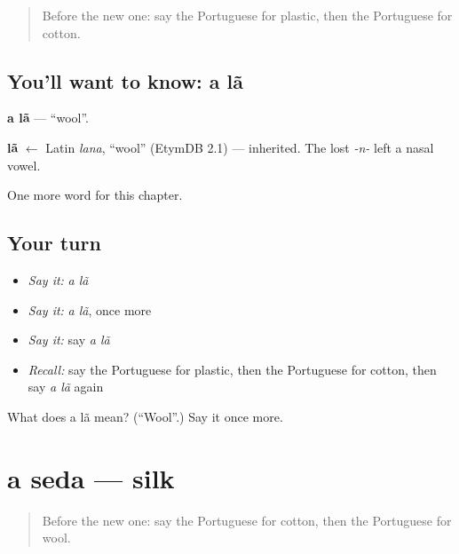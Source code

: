 \label{lesson:PT-C251-la}



\begin{quote}
Before the new one: say the Portuguese for plastic, then the Portuguese for cotton.
\end{quote}

\subsection*{You'll want to know: a lã}
\textbf{a lã} — \textquotedblleft{}wool\textquotedblright{}.

\begin{cousinweb}
\textbf{lã} $\leftarrow$ Latin \emph{lana}, \textquotedblleft{}wool\textquotedblright{} (EtymDB 2.1) — inherited. The lost \emph{-n-} left a nasal vowel.
\end{cousinweb}

\begin{grammarlens}[title={What you've built}]
One more word for this chapter.
\end{grammarlens}

\subsection*{Your turn}
\begin{itemize}
\raggedright
  \item \emph{Say it:} \emph{a lã}
  \item \emph{Say it:} \emph{a lã}, once more
  \item \emph{Say it:} say \emph{a lã}
  \item \emph{Recall:} say the Portuguese for plastic, then the Portuguese for cotton, then say \emph{a lã} again
\end{itemize}

\begin{tcolorbox}[breakable,colback=teal!4,colframe=teal!35!black,title={Before you move on}]
What does a lã mean? (\textquotedblleft{}Wool\textquotedblright{}.) Say it once more.
\end{tcolorbox}
\section[a seda]{a seda — silk}

\label{lesson:PT-C251-seda}



\begin{quote}
Before the new one: say the Portuguese for cotton, then the Portuguese for wool.
\end{quote}

